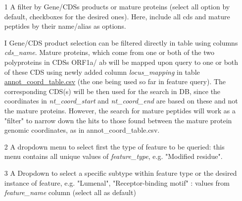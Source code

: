 \documentclass[a4paper, 10pt]{article}
\begin{document}
\begin{itemize}



 \item[1] A filter by Gene/CDSs products or mature proteins (select all option by default, checkboxes for the desired ones). Here, include all cds and mature peptides by their name/alias as options.
 
 \item[I] Gene/CDS product selection can be filtered directly in table using columns \textit{cds\_name}. Mature proteins, which come from one or both of the two polyproteins in CDSs ORF1a/ ab will be mapped upon query to one or both of these CDS using newly added column \textit{locus\_mapping} in table \href{https://github.com/clauw87/virusbeacon/blob/raw_ideas/annot_coord_table.csv}{annot\_coord\_table.csv} (the one being used so far in feature query). The corresponding CDS(s) will be then used for the search in DB, since the coordinates in \textit{nt\_coord\_start} and \textit{nt\_coord\_end} are based on these and not the mature proteins. However, the search for mature peptides will work as a "filter" to narrow down the hits to those found between the mature protein genomic coordinates, as in annot\_coord\_table.csv.

\item[2] A dropdown menu to select first the type of feature to be queried: this menu contains all unique values of \textit{feature\_type}, e.g. "Modified residue". 

\item[3] A Dropdown to select a specific subtype within feature type or the desired instance of feature, e.g. "Lumenal", "Receptor-binding motif" :  values from \textit{feature\_name} column  (select all as default)


\end{itemize}
\end{document}

